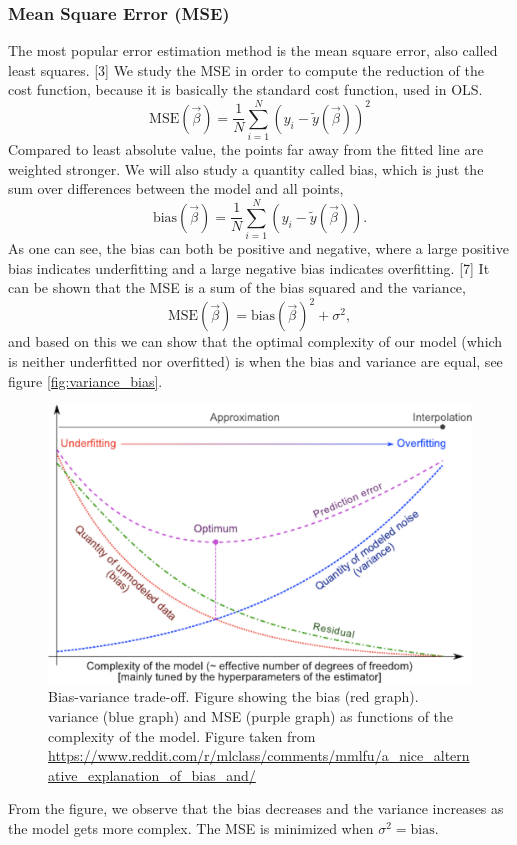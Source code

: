 \subsubsection{Mean Square Error (MSE)} \label{sec:MSE}
The most popular error estimation method is the mean square error, also called least squares. [3] We study the MSE in order to compute the reduction of the cost function, because it is basically the standard cost function, used in OLS. 
\begin{equation}
\text{MSE}(\vec{\beta})=\frac{1}{N}\sum_{i=1}^N(y_i-\tilde{y}(\vec{\beta}))^2
\end{equation}
Compared to least absolute value, the points far away from the fitted line are weighted stronger. We will also study a quantity called bias, which is just the sum over differences between the model and all points,
\begin{equation}
\text{bias}(\vec{\beta})=\frac{1}{N}\sum_{i=1}^N(y_i-\tilde{y}(\vec{\beta})).
\end{equation}
As one can see, the bias can both be positive and negative, where a large positive bias indicates underfitting and a large negative bias indicates overfitting. [7] It can be shown that the MSE is a sum of the bias squared and the variance,
\begin{equation}
\text{MSE}(\vec{\beta})=\text{bias}(\vec{\beta})^2+\sigma^2, 
\end{equation}
and based on this we can show that the optimal complexity of our model (which is neither underfitted nor overfitted) is when the bias and variance are equal, see figure \eqref{fig:variance_bias}.
 \begin{figure} [h]
	\centering
	\includegraphics[scale=0.3]{../plots/variance_bias.png}
	\caption{Bias-variance trade-off. Figure showing the bias (red graph). variance (blue graph) and MSE (purple graph) as functions of the complexity of the model. Figure taken from \url{https://www.reddit.com/r/mlclass/comments/mmlfu/a_nice_alternative_explanation_of_bias_and/}}
	\label{fig:variance_bias}
\end{figure}
From the figure, we observe that the bias decreases and the variance increases as the model gets more complex. The MSE is minimized when $\sigma^2=\text{bias}$. 

